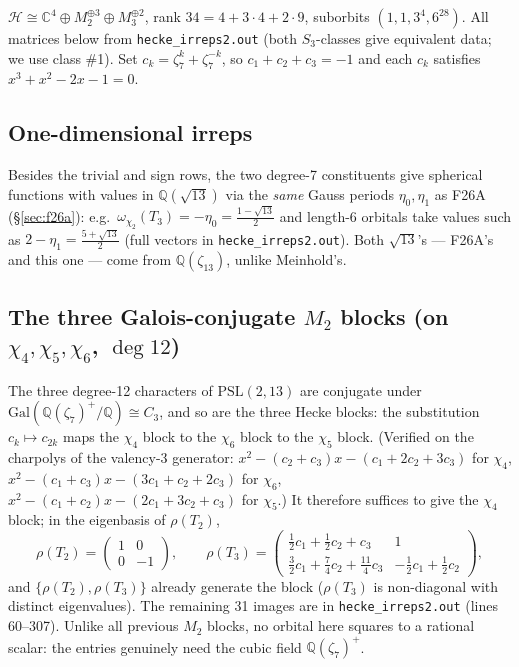 \documentclass[11pt]{article}
\theoremstyle{remark}
\newcommand{\C}{\mathbb{C}}
\newcommand{\Q}{\mathbb{Q}}
\newcommand{\T}[1]{T_{#1}}
\newcommand{\rh}[1]{\rho(T_{#1})}
\newcommand{\mat}[4]{\begin{pmatrix} #1 & #2 \\ #3 & #4 \end{pmatrix}}
\begin{document}
$\mathcal H \cong \C^4 \oplus M_2^{\oplus 3} \oplus M_3^{\oplus 2}$,
rank $34 = 4 + 3\cdot4 + 2\cdot9$, suborbits $(1,1,3^4,6^{28})$.
All matrices below from \texttt{hecke\_irreps2.out} (both $S_3$-classes
give equivalent data; we use class \#1). Set
$c_k = \zeta_7^k+\zeta_7^{-k}$, so $c_1+c_2+c_3=-1$ and each $c_k$
satisfies $x^3+x^2-2x-1=0$.

\subsection{One-dimensional irreps}

Besides the trivial and sign rows, the two degree-7 constituents give
spherical functions with values in $\Q(\sqrt{13})$ via the \emph{same}
Gauss periods $\eta_0,\eta_1$ as F26A (\S\ref{sec:f26a}): e.g.\
$\omega_{\chi_2}(\T3) = -\eta_0 = \frac{1-\sqrt{13}}{2}$ and length-6
orbitals take values such as $2-\eta_1=\frac{5+\sqrt{13}}{2}$
(full vectors in \texttt{hecke\_irreps2.out}). Both $\sqrt{13}$'s ---
F26A's and this one --- come from $\Q(\zeta_{13})$, unlike Meinhold's.

\subsection{The three Galois-conjugate $M_2$ blocks (on $\chi_4,\chi_5,\chi_6$, $\deg 12$)}

The three degree-12 characters of $\mathrm{PSL}(2,13)$ are conjugate
under $\mathrm{Gal}(\Q(\zeta_7)^+/\Q)\cong C_3$, and so are the three
Hecke blocks: the substitution $c_k\mapsto c_{2k}$ maps the $\chi_4$
block to the $\chi_6$ block to the $\chi_5$ block. (Verified on the
charpolys of the valency-3 generator:
$x^2-(c_2{+}c_3)x-(c_1{+}2c_2{+}3c_3)$ for $\chi_4$,
$x^2-(c_1{+}c_3)x-(3c_1{+}c_2{+}2c_3)$ for $\chi_6$,
$x^2-(c_1{+}c_2)x-(2c_1{+}3c_2{+}c_3)$ for $\chi_5$.)
It therefore suffices to give the $\chi_4$ block; in the eigenbasis of
$\rho(\T2)$,
\[
\rh2 = \mat{1}{0}{0}{-1},\qquad
\rh3 = \begin{pmatrix}
\tfrac12 c_1+\tfrac12 c_2+c_3 & 1\\[2pt]
\tfrac32 c_1+\tfrac74 c_2+\tfrac{11}4 c_3 & -\tfrac12 c_1+\tfrac12 c_2
\end{pmatrix},
\]
and $\{\rho(\T2),\rho(\T3)\}$ already generate the block ($\rho(\T3)$ is
non-diagonal with distinct eigenvalues). The remaining 31 images are in
\texttt{hecke\_irreps2.out} (lines 60--307). Unlike all previous $M_2$
blocks, no orbital here squares to a rational scalar: the entries
genuinely need the cubic field $\Q(\zeta_7)^+$.
\end{document}
